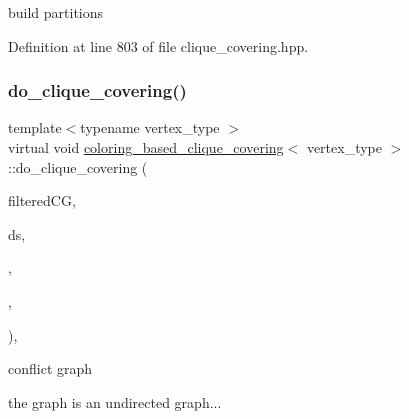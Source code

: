 build partitions 



Definition at line 803 of file clique\+\_\+covering.\+hpp.

\mbox{\label{classcoloring__based__clique__covering_ab6db4b8e878397afcd5378715d438046}} 
\subsubsection{\texorpdfstring{do\+\_\+clique\+\_\+covering()}{do\_clique\_covering()}}
{\footnotesize\ttfamily template$<$typename vertex\+\_\+type $>$ \\
virtual void \hyperlink{classcoloring__based__clique__covering}{coloring\+\_\+based\+\_\+clique\+\_\+covering}$<$ vertex\+\_\+type $>$\+::do\+\_\+clique\+\_\+covering (\begin{DoxyParamCaption}\item[{const \hyperlink{clique__covering__graph_8hpp_ac7a90ca8b64cfc536aaf17bc81186c18}{cc\+\_\+compatibility\+\_\+graph\+Ref}}]{filtered\+CG,  }\item[{boost\+::disjoint\+\_\+sets$<$ \hyperlink{clique__covering__graph_8hpp_af170aff46b9e4328f1ad9b119cf78b4a}{rank\+\_\+pmap\+\_\+type}, \hyperlink{clique__covering__graph_8hpp_af4c454ac367cfb12e29c98e6bc942a06}{pred\+\_\+pmap\+\_\+type} $>$ \&}]{ds,  }\item[{\hyperlink{classCustomUnorderedSet}{Custom\+Unordered\+Set}$<$ \hyperlink{clique__covering__graph_8hpp_a9cb45047ea8c5ed95a8cfa90494345aa}{C\+\_\+vertex} $>$ \&}]{,  }\item[{const \hyperlink{classCustomUnorderedSet}{Custom\+Unordered\+Set}$<$ \hyperlink{clique__covering__graph_8hpp_a9cb45047ea8c5ed95a8cfa90494345aa}{C\+\_\+vertex} $>$ \&}]{,  }\item[{const \hyperlink{structfilter__clique}{filter\+\_\+clique}$<$ vertex\+\_\+type $>$ \&}]{ }\end{DoxyParamCaption})\hspace{0.3cm}{\ttfamily [inline]}, {\ttfamily [virtual]}}

conflict graph

the graph is an undirected graph...

